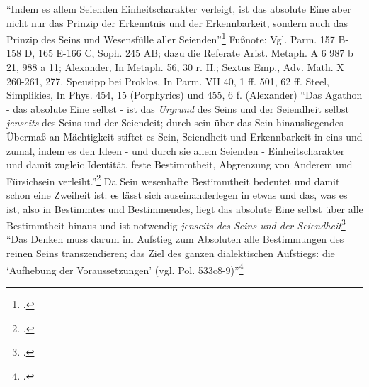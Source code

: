 \enquote{Indem es allem Seienden Einheitscharakter verleigt, ist das absolute Eine aber nicht nur das Prinzip der Erkenntnis und der Erkennbarkeit, sondern auch das Prinzip des Seins und Wesensfülle aller Seienden}\footcite[][S. 258]{halfwassenaufstieg2006}
Fußnote: Vgl. Parm. 157 B- 158 D, 165 E-166 C, Soph. 245 AB; dazu die Referate Arist. Metaph. A 6 987 b 21, 988 a 11; Alexander, In Metaph. 56, 30 r. H.; Sextus Emp., Adv. Math. X 260-261, 277. Speusipp bei Proklos, In Parm. VII 40, 1 ff. 501, 62 ff. Steel, Simplikies, In Phys. 454, 15 (Porphyrics) und 455, 6 f. (Alexander)
\enquote{Das Agathon - das absolute Eine selbst - ist das \emph{Urgrund} des Seins und der Seiendheit selbst \emph{jenseits} des Seins und der Seiendeit; durch sein über das Sein hinausliegendes Übermaß an Mächtigkeit stiftet es Sein, Seiendheit und Erkennbarkeit in eins und zumal, indem es den Ideen - und durch sie allem Seienden - Einheitscharakter und damit zugleic Identität, feste Bestimmtheit, Abgrenzung von Anderem und Fürsichsein verleiht.}\footcite[][S. 258f.]{halfwassenaufstieg2006}
Da Sein wesenhafte Bestimmtheit bedeutet und damit schon eine Zweiheit ist: es lässt sich auseinanderlegen in etwas und das, was es ist, also in Bestimmtes und Bestimmendes, liegt das absolute Eine selbst über alle Bestimmtheit hinaus und ist notwendig \emph{jenseits des Seins und der Seiendheit}\footcite[vgl.][S. 259f.]{halfwassenaufstieg2006}
\enquote{Das Denken muss darum im Aufstieg zum Absoluten alle Bestimmungen des reinen Seins transzendieren; das Ziel des ganzen dialektischen Aufstiegs: die \enquote{Aufhebung der Voraussetzungen} (vgl. Pol. 533c8-9)}\footcite[][S. 263]{halfwassenaufstieg2006}

